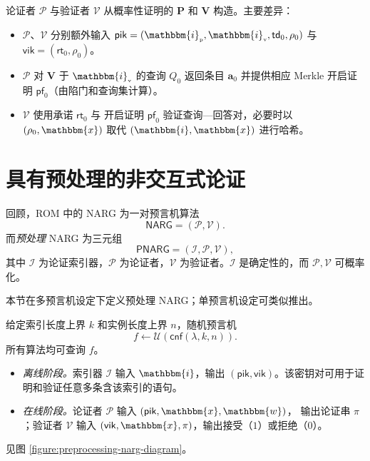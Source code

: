 \documentclass[american,singlepageview]{snargs-book-zh}
\renewcommand{\vec}[1]{\bm{#1}}
\newcommand{\Index}{\mathbbm{i}}
\newcommand{\Instance}{\mathbbm{x}}
\newcommand{\Witness}{\mathbbm{w}}
\newcommand{\IndexSize}{k}
\newcommand{\InstanceSize}{n}
\newcommand{\ProtoIndexer}{I}
\newcommand{\ProtoProver}{P}
\newcommand{\ProtoVerifier}{V}
\newcommand{\PPProver}{\mathbf{\ProtoProver}}
\newcommand{\PPVerifier}{\mathbf{\ProtoVerifier}}
\newcommand{\IOPEntry}{a}
\newcommand{\IOPEntries}{\vec{\IOPEntry}}
\newcommand{\IOPQuerySet}{Q}
\newcommand{\IOPVerifierRandomMessage}{\rho}
\newcommand{\ProverEncodedIndex}{\Index_{{\scriptscriptstyle\mathrm{p}}}}
\newcommand{\VerifierEncodedIndex}{\Index_{{\scriptscriptstyle\mathrm{v}}}}
\newcommand{\NARGSymbol}{\mathsf{NARG}}
\newcommand{\ARGFormat}[1]{\mathcal{#1}}
\newcommand{\ARGOracles}{\mathsf{cnf}}
\newcommand{\ARGIndexer}{\ARGFormat{\ProtoIndexer}}
\newcommand{\ARGProver}{\ARGFormat{\ProtoProver}}
\newcommand{\ARGVerifier}{\ARGFormat{\ProtoVerifier}}
\newcommand{\ARGSystem}{(\ARGProver,\ARGVerifier)}
\newcommand{\ARGString}{\pi}
\newcommand{\PNARGSymbol}{\mathsf{PNARG}}
\newcommand{\PARGSystem}{(\ARGIndexer,\ARGProver,\ARGVerifier)}
\newcommand{\ARGpik}{\mathsf{pik}}
\newcommand{\ARGvik}{\mathsf{vik}}
\newcommand{\IndexRoundSubscript}{0}
\newcommand{\ROFunction}{f}
\newcommand{\RODistribution}[1]{\mathcal{U}(#1)}
\newcommand{\SecurityParameter}{\lambda}
\newcommand{\MTCommitment}{\mathsf{rt}}
\newcommand{\MTTrapdoor}{\mathsf{td}}
\newcommand{\MTProof}{\mathsf{pf}}
\newcommand{\HashedIndex}{\IOPVerifierRandomMessage_{\IndexRoundSubscript}}
\begin{document}
论证者 $\ARGProver$ 与验证者 $\ARGVerifier$ 从概率性证明的 $\PPProver$ 和 $\PPVerifier$ 构造。主要差异：
\begin{itemize}[nolistsep]
  \item $\ARGProver$、$\ARGVerifier$ 分别额外输入
    $\ARGpik=(\ProverEncodedIndex,\VerifierEncodedIndex,
      \MTTrapdoor_{\IndexRoundSubscript},\HashedIndex)$
    与
    $\ARGvik=(\MTCommitment_{\IndexRoundSubscript},\HashedIndex)$。
  \item $\ARGProver$ 对 $\PPVerifier$ 于 $\VerifierEncodedIndex$ 的查询
    $\IOPQuerySet_{\IndexRoundSubscript}$ 返回条目 $\IOPEntries_{\IndexRoundSubscript}$
    并提供相应 Merkle 开启证明 $\MTProof_{\IndexRoundSubscript}$（由陷门和查询集计算）。
  \item $\ARGVerifier$ 使用承诺 $\MTCommitment_{\IndexRoundSubscript}$ 与
    开启证明 $\MTProof_{\IndexRoundSubscript}$ 验证查询—回答对，必要时以
    $(\HashedIndex,\Instance)$ 取代 $(\Index,\Instance)$ 进行哈希。
\end{itemize}

\section{具有预处理的非交互式论证}
\label{section:preprocessing-narg}

回顾，ROM 中的 NARG 为一对预言机算法
\[
  \NARGSymbol=\ARGSystem.
\]
而\emph{预处理} NARG 为三元组
\[
  \PNARGSymbol=\PARGSystem,
\]
其中 $\ARGIndexer$ 为论证索引器，$\ARGProver$ 为论证者，$\ARGVerifier$ 为验证者。$\ARGIndexer$ 是确定性的，而 $\ARGProver,\ARGVerifier$ 可概率化。

本节在多预言机设定下定义预处理 NARG；单预言机设定可类似推出。

给定索引长度上界 $\IndexSize$ 和实例长度上界 $\InstanceSize$，随机预言机
\[
  \ROFunction \gets \RODistribution{\ARGOracles(\SecurityParameter,\IndexSize,\InstanceSize)}.
\]
所有算法均可查询 $\ROFunction$。
\begin{itemize}
  \item \emph{离线阶段。}索引器 $\ARGIndexer$ 输入 $\Index$，输出
    $(\ARGpik,\ARGvik)$。该密钥对可用于证明和验证任意多条含该索引的语句。
  \item \emph{在线阶段。}论证者 $\ARGProver$ 输入 $(\ARGpik,\Instance,\Witness)$，
    输出论证串 $\ARGString$；验证者 $\ARGVerifier$ 输入
    $(\ARGvik,\Instance,\ARGString)$，输出接受（$1$）或拒绝（$0$）。
\end{itemize}
见图 \ref{figure:preprocessing-narg-diagram}。
\end{document}
